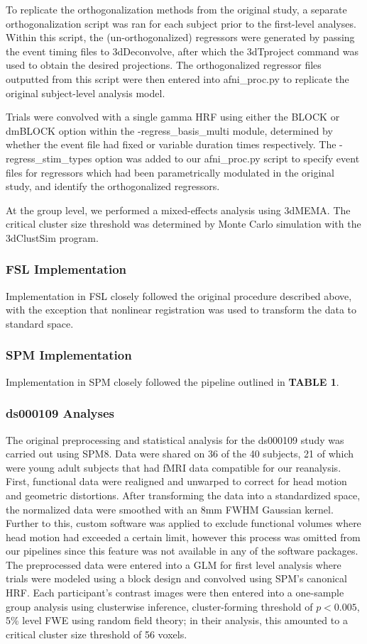 To replicate the orthogonalization methods from the original study, a separate orthogonalization script was ran for each subject prior to the first-level analyses. Within this script, the (un-orthogonalized) regressors were generated by passing the event timing files to 3dDeconvolve, after which the 3dTproject command was used to obtain the desired projections. The orthogonalized regressor files outputted from this script were then entered into afni\_proc.py to replicate the original subject-level analysis model. 

Trials were convolved with a single gamma HRF using either the BLOCK or dmBLOCK option within the -regress\_basis\_multi module, determined by whether the event file had fixed or variable duration times respectively. The -regress\_stim\_types option was added to our afni\_proc.py script to specify event files for regressors which had been parametrically modulated in the original study, and identify the orthogonalized regressors. 

At the group level, we performed a mixed-effects analysis using 3dMEMA. The critical cluster size threshold was determined by Monte Carlo simulation with the 3dClustSim program. 

\subsubsection{FSL Implementation}
Implementation in FSL closely followed the original procedure described above, with the exception that nonlinear registration was used to transform the data to standard space. 

\subsubsection{SPM Implementation}
Implementation in SPM closely followed the pipeline outlined in \textbf{TABLE 1}.

\subsubsection{ds000109 Analyses}
The original preprocessing and statistical analysis for the ds000109 study was carried out using SPM8. Data were shared on 36 of the 40 subjects, 21 of which were young adult subjects that had fMRI data compatible for our reanalysis. First, functional data were realigned and unwarped to correct for head motion and geometric distortions. After transforming the data into a standardized space, the normalized data were smoothed with an 8mm FWHM Gaussian kernel. Further to this, custom software was applied to exclude functional volumes where head motion had exceeded a certain limit, however this process was omitted from our pipelines since this feature was not available in any of the software packages. The preprocessed data were entered into a GLM for first level analysis where trials were modeled using a block design and convolved using SPM's canonical HRF. Each participant's contrast images were then entered into a one-sample group analysis using clusterwise inference, cluster-forming threshold of $p < 0.005$, 5\% level FWE using random field theory; in their analysis, this amounted to a critical cluster size threshold of 56 voxels. 

